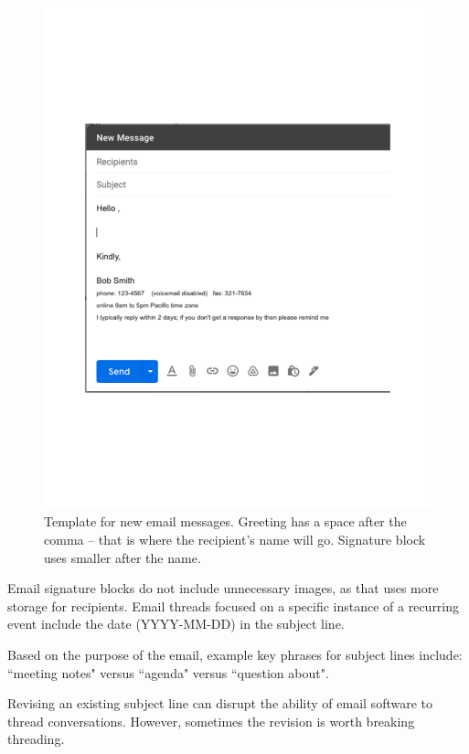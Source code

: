 \begin{figure}
\includegraphics[width=1\textwidth]{images/email_template.pdf}
\caption{Template for new email messages. Greeting has a space after the comma -- that is where the recipient's name will go. Signature block uses smaller after the name.}
\label{fig:email_template}
\end{figure}

Email signature blocks do not include unnecessary images, as that uses more storage for recipients. 
Email threads focused on a specific instance of a recurring event include the date (YYYY-MM-DD) in the subject line. 

Based on the purpose of the email, example key phrases for subject lines include: ``meeting notes" versus ``agenda" versus ``question about".

Revising an existing subject line can disrupt the ability of email software to thread conversations. However, sometimes the revision is worth breaking threading.

